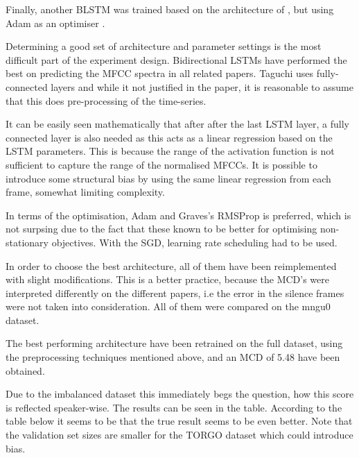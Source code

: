 \documentclass[a4paper]{article}
\begin{document}
Finally, another BLSTM was trained based on the architecture of
\cite{Liu2018}, but using Adam as an optimiser \cite{Kingma2015}.

Determining a good set of architecture and parameter settings is the most difficult part of
the experiment design. Bidirectional LSTMs have performed the best on predicting the MFCC spectra in
all related papers. Taguchi uses fully-connected layers and while it not justified in the paper, it
is reasonable to assume that this does pre-processing of the time-series. 

It can be easily seen mathematically that after after the last LSTM layer, a fully connected layer is also needed as this acts as a linear regression based on the LSTM parameters. This is because the range of the activation function is not sufficient to capture the range of the normalised MFCCs. It is possible to introduce some structural bias by using the same linear regression from each frame, somewhat limiting complexity. 

In terms of the optimisation, Adam and Graves's RMSProp is preferred, which is not surpsing due to the
fact that these known to be better for optimising non-stationary objectives. With the SGD,
learning rate scheduling had to be used. 

In order to choose the best architecture, all of them have been reimplemented with slight modifications.
This is a better practice, because the MCD's were interpreted differently on the different papers, i.e the error in the silence frames were not taken into consideration. All of them were compared on the mngu0 dataset.


The best performing architecture have been retrained on the full dataset, using the preprocessing techniques mentioned above, and an MCD of 5.48 have been obtained.

Due to the imbalanced dataset this immediately begs the question, how this score is reflected speaker-wise. The results can be seen in the table. According to the table below it seems to be that the true result seems to be even better. Note that the validation set sizes are smaller for the TORGO dataset which could introduce bias.
\end{document}
